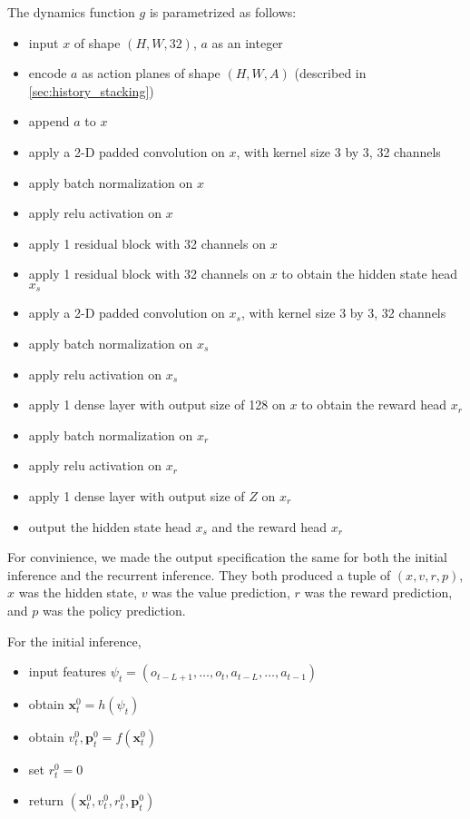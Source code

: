 The dynamics function $g$ is parametrized as follows:
\begin{itemize}
    \item input $x$ of shape $(H, W, 32)$, $a$ as an integer
    \item encode $a$ as action planes of shape $(H, W, A)$ (described in \ref{sec:history_stacking})
    \item append $a$ to $x$

    \item apply a 2-D padded convolution on $x$, with kernel size 3 by 3, 32 channels
    \item apply batch normalization on $x$
    \item apply relu activation on $x$

    \item apply 1 residual block with 32 channels on $x$

    \item apply 1 residual block with 32 channels on $x$ to obtain the hidden state head $x_s$
    \item apply a 2-D padded convolution on $x_s$, with kernel size 3 by 3, 32 channels
    \item apply batch normalization on $x_s$
    \item apply relu activation on $x_s$

    \item apply 1 dense layer with output size of 128 on $x$ to obtain the reward head $x_r$
    \item apply batch normalization on $x_r$
    \item apply relu activation on $x_r$
    \item apply 1 dense layer with output size of $Z$ on $x_r$

    \item output the hidden state head $x_s$ and the reward head $x_r$
\end{itemize}
For convinience, we made the output specification the same for both the initial inference and the recurrent inference.
They both produced a tuple of $(x, v, r, p)$, $x$ was the hidden state, $v$ was the value prediction, $r$ was the reward prediction, and $p$ was the policy prediction.

For the initial inference,
\begin{itemize}
    \item input features $\psi_t = (o_{t - L + 1}, \dots, o_t, a_{t - L}, \dots, a_{t -1})$
    \item obtain $\mathbf{x}_t^0 = h(\psi_t)$
    \item obtain $v^0_t, \mathbf{p}^0_t = f(\mathbf{x}_t^0)$
    \item set $r_t^0 = 0$
    \item return $(\mathbf{x}^0_t, v_t^0, r_t^0, \mathbf{p}^0_t)$
\end{itemize}

